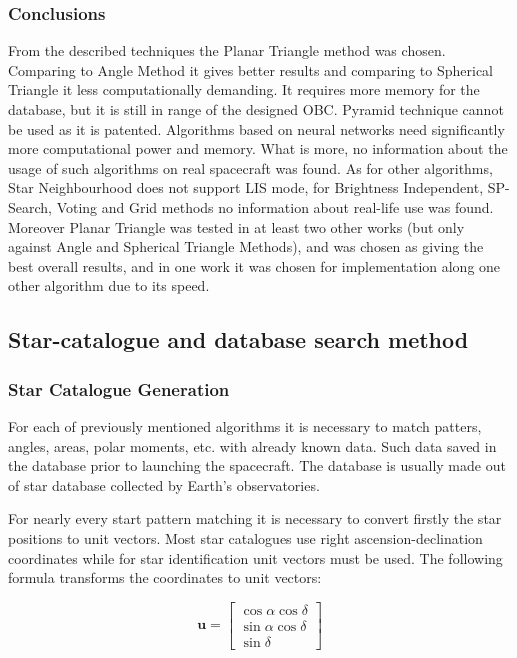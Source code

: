 \documentclass[12pt,a4paper,oneside]{article}
\begin{document}
\subsubsection{Conclusions}

From the described techniques the Planar Triangle method was chosen. Comparing to Angle Method it gives better results and comparing to Spherical Triangle it less computationally demanding\cite{tappe2009development}\cite{alidoost2013review}. It requires more memory for the database, but it is still in range of the designed OBC. Pyramid technique cannot be used as it is patented.
Algorithms based on neural networks need significantly more computational power and memory. What is more, no information about the usage of such algorithms on real spacecraft was found.
As for other algorithms, Star Neighbourhood does not support LIS mode, for Brightness Independent, SP-Search, Voting and Grid methods no information about real-life use was found. Moreover Planar Triangle was tested in at least two other works (but only against Angle and Spherical Triangle Methods), and was chosen as giving the best overall results, and in one work it was chosen for implementation along one other algorithm\cite{huffman2006designing} due to its speed.

\subsection{Star-catalogue and database search method}

\subsubsection{Star Catalogue Generation}

For each of previously mentioned algorithms it is necessary to match patters, angles, areas, polar moments, etc. with already known data. Such data saved in the database prior to launching the spacecraft. The database is usually made out of star database collected by Earth's observatories.
 
For nearly every start pattern matching it is necessary to convert firstly the star positions to unit vectors. Most star catalogues use right ascension-declination coordinates while for star identification unit vectors must be used\citet{mcbryde2012star}. The following formula transforms the coordinates to unit vectors:

\begin{equation}
\bm{u} = \begin{bmatrix}
\cos \alpha \cos \delta \\
\sin \alpha \cos \delta \\
\sin \delta
\end{bmatrix}
\end{equation}
\end{document}
